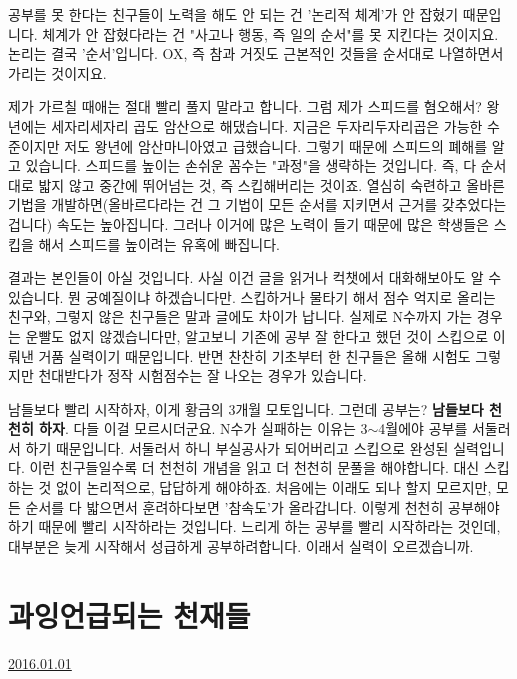 공부를 못 한다는 친구들이 노력을 해도 안 되는 건 '논리적 체계'가 안 잡혔기 때문입니다.
체계가 안 잡혔다라는 건 "사고나 행동, 즉 일의 순서"를 못 지킨다는 것이지요.
논리는 결국 '순서'입니다. OX, 즉 참과 거짓도 근본적인 것들을 순서대로 나열하면서 가리는 것이지요.
\vspace{5mm}

제가 가르칠 때애는 절대 빨리 풀지 말라고 합니다. 그럼 제가 스피드를 혐오해서?
왕년에는 세자리세자리 곱도 암산으로 해댔습니다. 지금은 두자리두자리곱은 가능한 수준이지만 저도 왕년에 암산마니아였고 급했습니다.
그렇기 때문에 스피드의 폐해를 알고 있습니다.
스피드를 높이는 손쉬운 꼼수는 "과정"을 생략하는 것입니다. 즉, 다 순서대로 밟지 않고 중간에 뛰어넘는 것, 즉 스킵해버리는 것이죠.
열심히 숙련하고 올바른 기법을 개발하면(올바르다라는 건 그 기법이 모든 순서를 지키면서 근거를 갖추었다는 겁니다) 속도는 높아집니다.
그러나 이거에 많은 노력이 들기 때문에 많은 학생들은 스킵을 해서 스피드를 높이려는 유혹에 빠집니다.
\vspace{5mm}

결과는 본인들이 아실 것입니다. 사실 이건 글을 읽거나 컥챗에서 대화해보아도 알 수 있습니다.
뭔 궁예질이냐 하겠습니다만. 스킵하거나 물타기 해서 점수 억지로 올리는 친구와, 그렇지 않은 친구들은 말과 글에도 차이가 납니다.
실제로 N수까지 가는 경우는 운빨도 없지 않겠습니다만, 알고보니 기존에 공부 잘 한다고 했던 것이 스킵으로 이뤄낸 거품 실력이기 때문입니다.
반면 찬찬히 기초부터 한 친구들은 올해 시험도 그렇지만 천대받다가 정작 시험점수는 잘 나오는 경우가 있습니다.
\vspace{5mm}

남들보다 빨리 시작하자, 이게 황금의 3개월 모토입니다.
그런데 공부는? \textbf{남들보다 천천히 하자}. 다들 이걸 모르시더군요.
N수가 실패하는 이유는 3$\sim$4월에야 공부를 서둘러서 하기 때문입니다. 서둘러서 하니 부실공사가 되어버리고 스킵으로 완성된 실력입니다.
이런 친구들일수록 더 천천히 개념을 읽고 더 천천히 문풀을 해야합니다. 대신 스킵하는 것 없이 논리적으로, 답답하게 해야하죠.
처음에는 이래도 되나 할지 모르지만, 모든 순서를 다 밟으면서 훈려하다보면 '참속도'가 올라갑니다.
이렇게 천천히 공부해야하기 때문에 빨리 시작하라는 것입니다.
느리게 하는 공부를 빨리 시작하라는 것인데, 대부분은 늦게 시작해서 성급하게 공부하려합니다. 이래서 실력이 오르겠습니까.
\vspace{5mm}








\section{과잉언급되는 천재들}
\href{https://www.kockoc.com/Apoc/571900}{2016.01.01}

